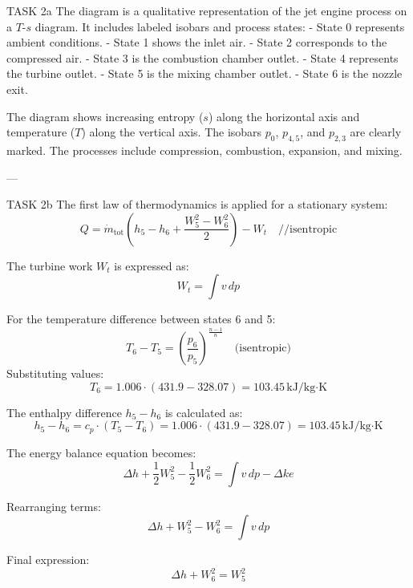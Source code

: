 TASK 2a  
The diagram is a qualitative representation of the jet engine process on a \( T \)-\( s \) diagram. It includes labeled isobars and process states:  
- State 0 represents ambient conditions.  
- State 1 shows the inlet air.  
- State 2 corresponds to the compressed air.  
- State 3 is the combustion chamber outlet.  
- State 4 represents the turbine outlet.  
- State 5 is the mixing chamber outlet.  
- State 6 is the nozzle exit.  

The diagram shows increasing entropy (\( s \)) along the horizontal axis and temperature (\( T \)) along the vertical axis. The isobars \( p_0 \), \( p_{4,5} \), and \( p_{2,3} \) are clearly marked. The processes include compression, combustion, expansion, and mixing.  

---

TASK 2b  
The first law of thermodynamics is applied for a stationary system:  
\[
Q = \dot{m}_{\text{tot}} \left( h_5 - h_6 + \frac{W_5^2 - W_6^2}{2} \right) - W_t \quad \text{//isentropic}
\]  

The turbine work \( W_t \) is expressed as:  
\[
W_t = \int v \, dp
\]  

For the temperature difference between states 6 and 5:  
\[
T_6 - T_5 = \left( \frac{p_6}{p_5} \right)^{\frac{n-1}{n}} \quad \text{(isentropic)}
\]  
Substituting values:  
\[
T_6 = 1.006 \cdot (431.9 - 328.07) = 103.45 \, \text{kJ/kg·K}
\]  

The enthalpy difference \( h_5 - h_6 \) is calculated as:  
\[
h_5 - h_6 = c_p \cdot (T_5 - T_6) = 1.006 \cdot (431.9 - 328.07) = 103.45 \, \text{kJ/kg·K}
\]  

The energy balance equation becomes:  
\[
\Delta h + \frac{1}{2} W_5^2 - \frac{1}{2} W_6^2 = \int v \, dp - \Delta ke
\]  

Rearranging terms:  
\[
\Delta h + W_5^2 - W_6^2 = \int v \, dp
\]  

Final expression:  
\[
\Delta h + W_6^2 = W_5^2
\]